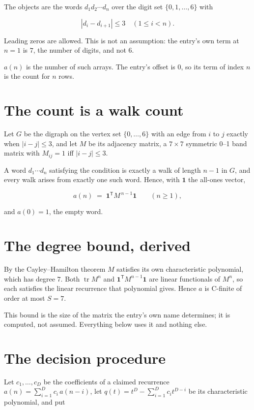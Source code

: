 \documentclass[11pt]{article}
\theoremstyle{definition}
\begin{document}
The objects are the words $d_1 d_2 \cdots d_n$ over the digit set $\{0,1,\dots,6\}$ with

\[|d_i - d_{i+1}| \le 3\quad (1 \le i < n).\]

Leading zeros are allowed. This is not an assumption: the entry's own term at $n=1$ is $7$, the number of digits, and not $6$.

$a(n)$ is the number of such arrays. The entry's offset is 0, so its term of index $n$ is the count for $n$ rows.

\section{The count is a walk count}

Let $G$ be the digraph on the vertex set $\{0,\dots,6\}$ with an edge from $i$ to $j$ exactly when $|i-j| \le 3$, and let $M$ be its adjacency matrix, a $7 \times 7$ symmetric 0--1 band matrix with $M_{ij} = 1$ iff $|i-j| \le 3$.

A word $d_1\cdots d_n$ satisfying the condition is exactly a walk of length $n-1$ in $G$, and every walk arises from exactly one such word. Hence, with $\mathbf 1$ the all-ones vector,

\[a(n) \;=\; \mathbf 1^{\mathsf T} M^{\,n-1} \mathbf 1 \qquad (n \ge 1),\]

and $a(0) = 1$, the empty word.

\section{The degree bound, derived}

By the Cayley--Hamilton theorem $M$ satisfies its own characteristic polynomial, which has degree $7$. Both $\operatorname{tr} M^n$ and $\mathbf 1^{\mathsf T} M^{n-1} \mathbf 1$ are linear functionals of $M^{n}$, so each satisfies the linear recurrence that polynomial gives. Hence $a$ is C-finite of order at most $S = 7$.

This bound is the size of the matrix the entry's own name determines; it is computed, not assumed. Everything below uses it and nothing else.

\section{The decision procedure}

Let $c_1,\dots,c_D$ be the coefficients of a claimed recurrence $a(n) = \sum_{i=1}^{D} c_i\,a(n-i)$, let $q(t) = t^{D} - \sum_{i=1}^{D} c_i t^{D-i}$ be its characteristic polynomial, and put
\end{document}
